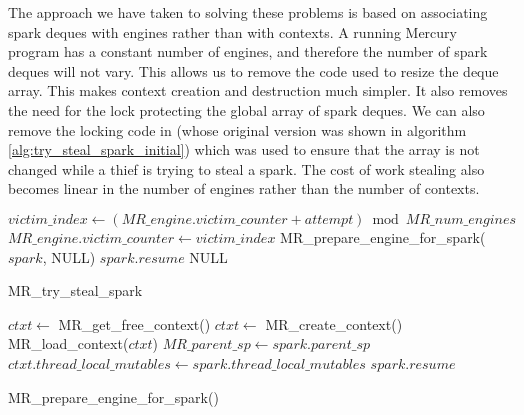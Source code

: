 The approach we have taken to solving these problems is based on associating
spark deques with engines rather than with contexts.
A running Mercury program has a constant number of engines,
and therefore the number of spark deques will not vary.
This allows us to remove the code used to resize the deque array.
This makes context creation and destruction much simpler.
It also removes the need for the lock protecting the global array of spark
deques.
We can also remove the locking code in \trystealspark
(whose original version was shown in algorithm
\ref{alg:try_steal_spark_initial})
which was used to
ensure that the array is not changed while a thief is trying to steal a
spark.
The cost of work stealing also becomes linear in the number of engines
rather than the number of contexts.

\begin{algorithm}[tbp]
\begin{algorithmic}[1]
      \State $victim\_index \gets
          (MR\_engine.victim\_counter + attempt) \bmod MR\_num\_engines$
        \State $MR\_engine.victim\_counter \gets victim\_index$
        \State MR\_prepare\_engine\_for\_spark($spark$, NULL)
        \State \Return $spark.resume$
      \EndIf
    \EndFor
  \EndIf
  \State \Return NULL
\EndProcedure
\end{algorithmic}
\caption{MR\_try\_steal\_spark}
\label{alg:try_steal_spark_revised}
\end{algorithm}

\begin{algorithm}[tbp]
\begin{algorithmic}
        \State $ctxt \gets$ MR\_get\_free\_context()
            \State $ctxt \gets$ MR\_create\_context()
        \EndIf
        \State MR\_load\_context($ctxt$)
    \EndIf
    \State $MR\_parent\_sp \gets spark.parent\_sp$
    \State $ctxt.thread\_local\_mutables \gets
      spark.thread\_local\_mutables$
    \State \Return $spark.resume$
\EndProcedure
\end{algorithmic}
\caption{MR\_prepare\_engine\_for\_spark()}
\label{alg:prepare_engine_for_spark}
\end{algorithm}

